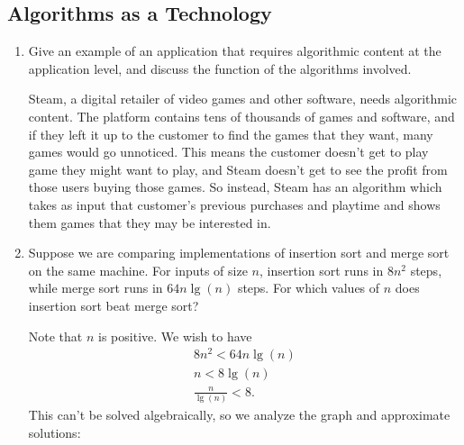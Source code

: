 \documentclass[Chapter01]{subfiles}
\begin{document}
	\subsection{Algorithms as a Technology}

	\begin{enumerate}[leftmargin=\labelsep]
		\item Give an example of an application that requires algorithmic content at the application level, and discuss the function of the algorithms involved.
		\begin{answer}
			Steam, a digital retailer of video games and other software, needs algorithmic content. The platform contains tens of thousands of games and software, and if they left it up to the customer to find the games that they want, many games would go unnoticed. This means the customer doesn't get to play game they might want to play, and Steam doesn't get to see the profit from those users buying those games. So instead, Steam has an algorithm which takes as input that customer's previous purchases and playtime and shows them games that they may be interested in.
		\end{answer}

		\item Suppose we are comparing implementations of insertion sort and merge sort on the same machine. For inputs of size $n$, insertion sort runs in $8n^2$ steps, while merge sort runs in $64n \lg(n)$ steps. For which values of $n$ does insertion sort beat merge sort?
		\begin{answer}
			Note that $n$ is positive. We wish to have
			\begin{align*}
				8n^2 < 64n \lg(n) \tag*{$\impliedby$}\\
				n < 8 \lg(n) \tag*{$\impliedby$}\\
				\frac{n}{\lg(n)} < 8.
			\end{align*}
			This can't be solved algebraically, so we analyze the graph and approximate solutions:
			\begin{figure}[h]
				\centering
			\end{figure}


\end{answer}
\end{enumerate}
\end{document}
